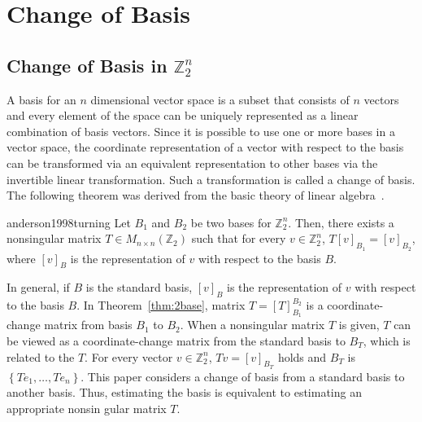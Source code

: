 \section{Change of Basis} \label{sec3:cob}
\subsection{Change of Basis in $ \mathbb{Z}_2^n $}
A basis for an $ n $ dimensional vector space is a subset that consists of $ n $ vectors and every element of the space can be uniquely represented as a linear combination of basis vectors. Since it is possible to use one or more bases in a vector space, the coordinate representation of a vector with respect to the basis can be transformed via an equivalent representation to other bases via the invertible linear transformation. Such a transformation is called a change of basis. The following theorem was derived from the basic theory of linear algebra~\cite{anderson1998turning}.
\begin{theorem} \label{thm:2base}                                                                                                                                                                                                                                                                                                                                                                                                                                                                                                                                                               anderson1998turning
Let $ B_1 $ and $ B_2 $ be two bases for $ \mathbb{Z}_2^n $. Then, there exists a nonsingular matrix $ T\in M_{n\times n}\left(\mathbb{Z}_2\right) $ such that for every $ v\in\mathbb{Z}_2^n $, $ T\left[v\right]_{B_1}=\left[v\right]_{B_2} $, where $ \left[v\right]_B $ is the representation of $ v $ with respect to the basis $ B $.
\end{theorem}
In general, if $ B $ is the standard basis, $ \left[v\right]_B $ is the representation of $ v $ with respect to the basis $ B $. In Theorem~\ref{thm:2base}, matrix $ T=\left[T\right]_{B_1}^{B_2} $ is a coordinate-change matrix from basis $ B_1 $ to $ B_2 $. When a nonsingular matrix $ T $ is given, $ T $ can be viewed as a coordinate-change matrix from the standard basis to $ B_T $, which is related to the $ T $. For every vector $ v\in\mathbb{Z}_2^n $, $ Tv=\left[v\right]_{B_T} $ holds and $ B_T $ is $ \left\{Te_1,\ldots,Te_n\right\} $. This paper considers a change of basis from a standard basis to another basis. Thus, estimating the basis is equivalent to estimating an appropriate nonsin
gular matrix $ T $.

